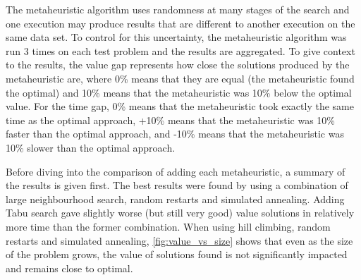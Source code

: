 The metaheuristic algorithm uses randomness at many stages of the search and one execution may produce results that are different to another execution on the same data set. To control for this uncertainty, the metaheuristic algorithm was run 3 times on each test problem and the results are aggregated. To give context to the results, the value gap represents how close the solutions produced by the metaheuristic are, where 0\% means that they are equal (the metaheuristic found the optimal) and 10\% means that the metaheuristic was 10\% below the optimal value. For the time gap, 0\% means that the metaheuristic took exactly the same time as the optimal approach, +10\% means that the metaheuristic was 10\% faster than the optimal approach, and -10\% means that the metaheuristic was 10\% slower than the optimal approach.

Before diving into the comparison of adding each metaheuristic, a summary of the results is given first. The best results were found by using a combination of large neighbourhood search, random restarts and simulated annealing. Adding Tabu search gave slightly worse (but still very good) value solutions in relatively more time than the former combination. When using hill climbing, random restarts and simulated annealing, \cref{fig:value_vs_size} shows that even as the size of the problem grows, the value of solutions found is not significantly impacted and remains close to optimal.

